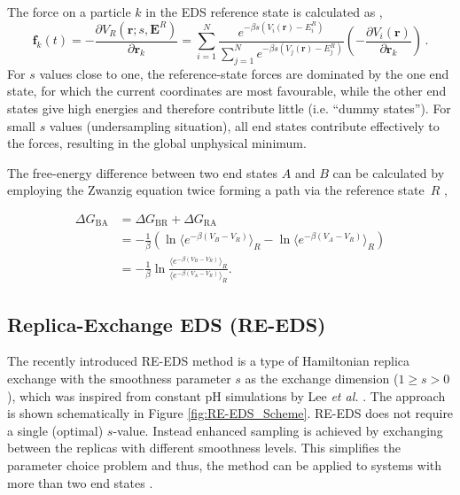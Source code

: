 The force on a particle $k$ in the EDS reference state is calculated as \cite{Christ2008},
\begin{equation}
    \textbf{f}_k(t)=-\frac{\partial V_R(\textbf{r}; s, \textbf{E}^R)}{\partial \textbf{r}_k} = \sum^N_{i=1}\frac{e^{-\beta s(V_i(\textbf{r}) -E_i^R)}}{\sum^N_{j=1}{e^{-\beta s (V_j(\textbf{r})-E_j^R)}}}  \left( -\frac{\partial V_i(\textbf{r})}{\partial \textbf{r}_k} \right) \,.
    \label{eq:laws_of_motion}
\end{equation}
%
For $s$ values close to one, the reference-state forces are dominated by the one end state, for which the current coordinates are most favourable, while the other end states give high energies and therefore contribute little (i.e. ``dummy states'').  
For small $s$ values (undersampling situation), all end states contribute effectively to the forces, resulting in the global unphysical minimum.

The free-energy difference between two end states $A$ and $B$ can be calculated by employing the Zwanzig equation twice forming a path via the reference state~$R$ \cite{Zwanzig1954,Christ2007,Christ2008},

\begin{align} \nonumber
    \Delta G_{\text{BA}} &=  \Delta G_{\text{BR}} + \Delta G_{\text{RA}} \\ 
    &=-\frac{1}{\beta}\left(\ln \langle e^{-\beta (V_B-V_R)}\rangle_R - \ln \langle e^{-\beta (V_A-V_R )}\rangle_R\right) \\ 
    &= -\frac{1}{\beta} \ln \frac{\langle e^{-\beta (V_B-V_R)}\rangle_R}{\langle e^{-\beta (V_A-V_R)}\rangle_R}.
    \label{EQ: Free Energy calculation via reference state}
 \end{align}

\FloatBarrier

\subsection{Replica-Exchange EDS (RE-EDS)}
The recently introduced RE-EDS method \cite{Sidler2016,Sidler2017} is a type of Hamiltonian replica exchange \cite{Hansmann1997,Sugita2000} with the smoothness parameter $s$ as the exchange dimension ($1 \geq s > 0$), which was inspired from constant pH simulations by Lee \textit{et al.} \cite{Lee2014,Lee2015}. The approach is shown schematically in Figure \ref{fig:RE-EDS_Scheme}.
RE-EDS does not require a single (optimal) $s$-value. Instead enhanced sampling is achieved by exchanging between the replicas with different smoothness levels. This simplifies the parameter choice problem and thus, the method can be applied to systems with more than two end states \cite{Sidler2016,Sidler2017}.

